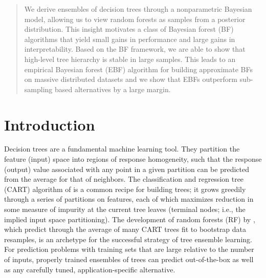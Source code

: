 \documentclass{article}
\begin{document}
 


\begin{abstract} 
We derive ensembles of decision trees through
a nonparametric Bayesian model, allowing us to
view random forests as samples from a posterior distribution. This insight motivates a class
of Bayesian forest (BF) algorithms that yield
small gains in performance and large gains in
interpretability. Based on the BF framework,
we are able to show that high-level tree hierarchy is stable in large samples. This leads to an
empirical Bayesian forest (EBF) algorithm for
building approximate BFs on massive distributed
datasets and we show that EBFs outperform sub-sampling based alternatives by a large margin.
\end{abstract} 

\section{Introduction}\label{introduction}

Decision trees are a fundamental machine learning tool. They partition the
feature (input) space into regions of response homogeneity, such that the
response (output) value associated with any point in a given partition can be
predicted from the average for that of neighbors. The classification and
regression tree (CART) algorithm of \cite{breiman_classification_1984} is a
common recipe for building trees; it grows greedily through a series of
partitions on features, each of which maximizes reduction in some measure of
impurity at the current tree leaves (terminal nodes; i.e., the implied input
space partitioning). The development of random forests (RF) by
\cite{breiman_random_2001}, which predict through the average of many CART
trees fit to bootstrap data resamples, is an archetype for the
successful strategy of tree ensemble learning. For prediction problems with
training sets that are large relative to the number of inputs, properly trained ensembles of
trees can predict out-of-the-box as well as any carefully tuned,
application-specific alternative.
\end{document}

